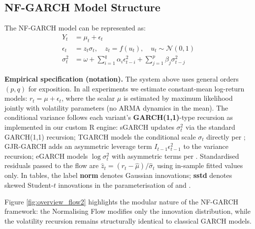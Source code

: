 \documentclass[risks,article,submit,pdftex,moreauthors]{Definitions/mdpi}
\begin{document}
\subsection{NF-GARCH Model Structure} 

The NF-GARCH model can be represented as:
\begin{align}
Y_t &= \mu_t + \epsilon_t \\
\epsilon_t &= z_t \sigma_t, \quad z_t = f(u_t), \quad u_t \sim \mathcal{N}(0,1) \\
\sigma_t^2 &= \omega + \sum_{i=1}^q \alpha_i \epsilon_{t-i}^2 + \sum_{j=1}^p \beta_j \sigma_{t-j}^2
\end{align}

\noindent\textbf{Empirical specification (notation).} The system above uses general orders $(p,q)$ for exposition. In all experiments we estimate constant-mean log-return models: $r_t = \mu + \epsilon_t$, where the scalar $\mu$ is estimated by maximum likelihood jointly with volatility parameters (no ARMA dynamics in the mean). The conditional variance follows each variant's \textbf{GARCH(1,1)}-type recursion as implemented in our custom \textsf{R} engine: sGARCH updates $\sigma_t^2$ via the standard GARCH(1,1) recursion; TGARCH models the conditional scale $\sigma_t$ directly per \cite{zakoian1994threshold}; GJR-GARCH adds an asymmetric leverage term $I_{t-1}\epsilon_{t-1}^2$ to the variance recursion; eGARCH models $\log\sigma_t^2$ with asymmetric terms per \cite{nelson1991conditional}. Standardised residuals passed to the flow are $\hat{z}_t = (r_t - \hat{\mu})/\hat{\sigma}_t$ using in-sample fitted values only. In tables, the label \textbf{norm} denotes Gaussian innovations; \textbf{sstd} denotes skewed Student-$t$ innovations in the parameterisation of \cite{fernandez1998multivariate} and \cite{hansen1994autoregressive}.

Figure \ref{fig:overview_flow2} highlights the modular nature of the NF-GARCH framework: the Normalising Flow modifies only the innovation distribution, while the volatility recursion remains structurally identical to classical GARCH models.
\end{document}
